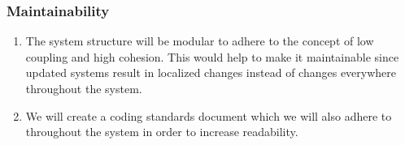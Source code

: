 \documentclass[11pt]{article}
\begin{document}
\subsubsection{Maintainability}
\begin{enumerate}
	\item The system structure will be modular to adhere to the concept of low coupling and high cohesion. This would help to make it maintainable since updated systems result in localized changes instead of changes everywhere throughout the system.
	\item We will create a coding standards document which we will also adhere to throughout the system in order to increase readability.
\end{enumerate}



\end{document}
